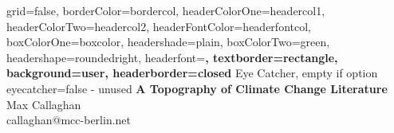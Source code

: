 \documentclass[a0paper,portrait]{baposter}
\begin{document}

\background{
}

\begin{poster}{
	grid=false,
	borderColor=bordercol,
	headerColorOne=headercol1,
	headerColorTwo=headercol2,
	headerFontColor=headerfontcol,
	boxColorOne=boxcolor,
	headershade=plain,
	boxColorTwo=green,
	headershape=roundedright,
	headerfont=\Large\sf\bf,
	textborder=rectangle,
	background=user,
  	headerborder=closed
}
{
	Eye Catcher, empty if option eyecatcher=false - unused
}
{\sf\bf
	A Topography of Climate Change Literature
}
{
	\vspace{0.8em} Max Callaghan\\
	{\smaller callaghan@mcc-berlin.net}
}
{
\setlength\fboxsep{0pt}
\setlength\fboxrule{0.5pt}
	}
\end{poster}
\end{document}
